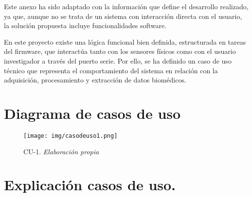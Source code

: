 
Este anexo ha sido adaptado con la información que define el desarrollo realizado, ya que, aunque no se trata de un sistema con interacción directa con el usuario, la solución propuesta incluye funcionalidades software.


En este proyecto existe una lógica funcional bien definida, estructurada en tareas del firmware, que interactúa tanto con los sensores físicos como con el usuario investigador a través del puerto serie. Por ello, se ha definido un caso de uso técnico que representa el comportamiento del sistema en relación con la adquisición, procesamiento y extracción de datos biomédicos.

\section{Diagrama de casos de uso}

\begin{figure}[H]
    \centering
    \texttt{[image: img/casodeuso1.png]}
    \caption{CU-1. \textit{Elaboración propia}}
    \label{fig:casos_uso}
\end{figure}



\section{Explicación casos de uso.}


